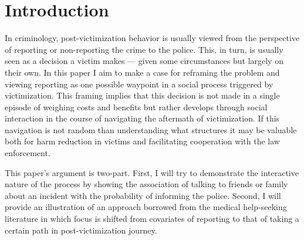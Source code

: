 \documentclass[]{interact}
\theoremstyle{plain}%
\theoremstyle{definition}
\theoremstyle{remark}
\begin{document}
	\section*{Introduction}
	
	In criminology, post-victimization behavior is usually viewed from the perspective of reporting or non-reporting the crime to the police. This, in turn, is usually seen as a decision a victim makes --- given some circumstances but largely on their own. In this paper I aim to make a case for reframing the problem and viewing reporting as one possible waypoint in a social process triggered by victimization. This framing implies that this decision is not made in a single episode of weighing costs and benefits but rather develops through social interaction in the course of navigating the aftermath of victimization. If this navigation is not random than understanding what structures it may be valuable both for harm reduction in victims and facilitating cooperation with the law enforcement.
	
	This paper's argument is two-part. First, I will try to demonstrate the interactive nature of the process by showing the association of talking to friends or family about an incident with the probability of informing the police. Second, I will provide an illustration of an approach borrowed from the medical help-seeking literature in which focus is shifted from covariates of reporting to that of taking a certain path in post-victimization journey. 
	
\end{document}
